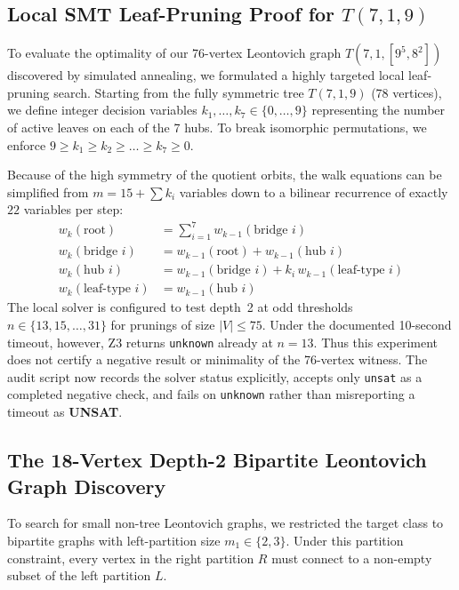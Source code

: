 \subsection{Local SMT Leaf-Pruning Proof for \texorpdfstring{$T(7,1,9)$}{T(7,1,9)}}
\label{sec:local-pruning-audit}

To evaluate the optimality of our 76-vertex Leontovich graph
$T(7,1,[9^5, 8^2])$ discovered by simulated annealing, we formulated a
highly targeted local leaf-pruning search. Starting from the fully symmetric
tree $T(7,1,9)$ (78 vertices), we define integer decision variables $k_1,
\dots, k_7 \in \{0, \dots, 9\}$ representing the number of active leaves on
each of the 7 hubs. To break isomorphic permutations, we enforce $9 \ge k_1 \ge
k_2 \ge \dots \ge k_7 \ge 0$.

Because of the high symmetry of the quotient orbits, the walk equations can be
simplified from $m = 15 + \sum k_i$ variables down to a bilinear recurrence of
exactly $22$ variables per step:
\begin{align}
  w_k(\text{root}) &= \sum_{i=1}^{7} w_{k-1}(\text{bridge } i) \\
  w_k(\text{bridge } i) &= w_{k-1}(\text{root}) + w_{k-1}(\text{hub } i) \\
  w_k(\text{hub } i) &= w_{k-1}(\text{bridge } i) + k_i \, w_{k-1}(\text{leaf-type } i) \\
  w_k(\text{leaf-type } i) &= w_{k-1}(\text{hub } i)
\end{align}
The local solver is configured to test depth~2 at odd thresholds
$n\in\{13,15,\ldots,31\}$ for prunings of size $|V|\le75$. Under the
documented 10-second timeout, however, Z3 returns \texttt{unknown} already at
$n=13$. Thus this experiment does not certify a negative result or minimality
of the 76-vertex witness. The audit script now records the solver status
explicitly, accepts only \texttt{unsat} as a completed negative check, and
fails on \texttt{unknown} rather than misreporting a timeout as
\textbf{UNSAT}.

\subsection{The 18-Vertex Depth-2 Bipartite Leontovich Graph Discovery}

To search for small non-tree Leontovich graphs, we restricted the
target class to bipartite graphs with left-partition size $m_1 \in \{2, 3\}$.
Under this partition constraint, every vertex in the right partition $R$ must
connect to a non-empty subset of the left partition $L$.

